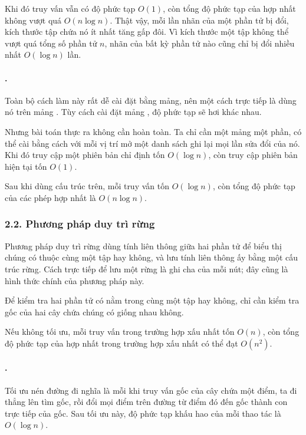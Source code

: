 \documentclass[11pt]{article}
\begin{document}
Khi đó truy vấn vẫn có độ phức tạp \(O(1)\), còn tổng độ phức tạp của hợp
nhất không vượt quá \(O(n\log n)\). Thật vậy, mỗi lần nhãn của một phần tử bị
đổi, kích thước tập chứa nó ít nhất tăng gấp đôi. Vì kích thước một tập không
thể vượt quá tổng số phần tử \(n\), nhãn của bất kỳ phần tử nào cũng chỉ bị
đổi nhiều nhất \(O(\log n)\) lần.

\paragraph{.}
Toàn bộ cách làm này rất dễ cài đặt bằng mảng, nên một cách trực tiếp là dùng
nó trên mảng . Tùy cách cài đặt mảng , độ
phức tạp sẽ hơi khác nhau.

Nhưng bài toán thực ra không cần  hoàn toàn. Ta chỉ cần một
mảng  một phần, có thể cài bằng cách với mỗi vị trí mở một
danh sách ghi lại mọi lần sửa đổi của nó. Khi đó truy cập một phiên bản chỉ
định tốn \(O(\log n)\), còn truy cập phiên bản hiện tại tốn \(O(1)\).

Sau khi dùng cấu trúc trên, mỗi truy vấn tốn \(O(\log n)\), còn tổng độ phức
tạp của các phép hợp nhất là \(O(n\log n)\).

\subsubsection*{2.2. Phương pháp duy trì rừng}

Phương pháp duy trì rừng dùng tính liên thông giữa hai phần tử để biểu thị
chúng có thuộc cùng một tập hay không, và lưu tính liên thông ấy bằng một cấu
trúc rừng. Cách trực tiếp để lưu một rừng là ghi cha của mỗi nút; đây cũng là
hình thức chính của phương pháp này.

Để kiểm tra hai phần tử có nằm trong cùng một tập hay không, chỉ cần kiểm tra
gốc của hai cây chứa chúng có giống nhau không.

Nếu không tối ưu, mỗi truy vấn trong trường hợp xấu nhất tốn \(O(n)\), còn
tổng độ phức tạp của hợp nhất trong trường hợp xấu nhất có thể đạt \(O(n^2)\).

\paragraph{.}
Tối ưu nén đường đi nghĩa là mỗi khi truy vấn gốc của cây chứa một điểm, ta đi
thẳng lên tìm gốc, rồi đổi mọi điểm trên đường từ điểm đó đến gốc thành con
trực tiếp của gốc. Sau tối ưu này, độ phức tạp khấu hao của mỗi thao tác là
\(O(\log n)\).
\end{document}
